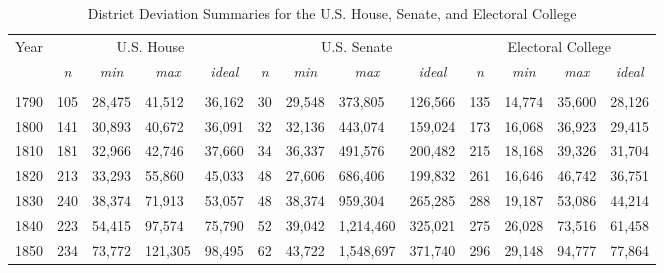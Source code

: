 
\begin{landscape}

\begin{table}[!htbp] \centering 
  \caption{District Deviation Summaries for the U.S. House, Senate, and Electoral College} 
  \label{tab:dist_details} 
\begin{tabular}{p{1.5cm}|p{1cm}p{1.75cm}p{1.75cm}p{1.75cm}|p{1cm}p{1.75cm}p{1.75cm}p{1.75cm}|p{1cm}p{1.75cm}p{1.75cm}p{1.75cm}}
\multicolumn{1}{c}{Year} & \multicolumn{4}{c}{U.S. House} & \multicolumn{4}{c}{U.S. Senate} & \multicolumn{4}{c}{Electoral College} \\ 
\multicolumn{1}{c}{} & \multicolumn{1}{c}{\textit{n}} & \multicolumn{1}{c}{\textit{min}} & \multicolumn{1}{c}{\textit{max}} & \multicolumn{1}{c}{\textit{ideal}} & \multicolumn{1}{c}{\textit{n}} & \multicolumn{1}{c}{\textit{min}} & \multicolumn{1}{c}{\textit{max}} & \multicolumn{1}{c}{\textit{ideal}} & \multicolumn{1}{c}{\textit{n}} & \multicolumn{1}{c}{\textit{min}} & \multicolumn{1}{c}{\textit{max}} & \multicolumn{1}{c}{\textit{ideal}} \\ 
\hline \\[-1.8ex] 
\multicolumn{1}{c}{1790} & 105 & 28,475 & 41,512 & 36,162 & 30 & 29,548 & 373,805 & 126,566 & 135 & 14,774 & 35,600 & 28,126 \\ 
\multicolumn{1}{c}{1800} & 141 & 30,893 & 40,672 & 36,091 & 32 & 32,136 & 443,074 & 159,024 & 173 & 16,068 & 36,923 & 29,415 \\ 
\multicolumn{1}{c}{1810} & 181 & 32,966 & 42,746 & 37,660 & 34 & 36,337 & 491,576 & 200,482 & 215 & 18,168 & 39,326 & 31,704 \\ 
\multicolumn{1}{c}{1820} & 213 & 33,293 & 55,860 & 45,033 & 48 & 27,606 & 686,406 & 199,832 & 261 & 16,646 & 46,742 & 36,751 \\ 
\multicolumn{1}{c}{1830} & 240 & 38,374 & 71,913 & 53,057 & 48 & 38,374 & 959,304 & 265,285 & 288 & 19,187 & 53,086 & 44,214 \\ 
\multicolumn{1}{c}{1840} & 223 & 54,415 & 97,574 & 75,790 & 52 & 39,042 & 1,214,460 & 325,021 & 275 & 26,028 & 73,516 & 61,458 \\ 
\multicolumn{1}{c}{1850} & 234 & 73,772 & 121,305 & 98,495 & 62 & 43,722 & 1,548,697 & 371,740 & 296 & 29,148 & 94,777 & 77,864 \\ 

\end{tabular}
\end{table}
\end{landscape}
